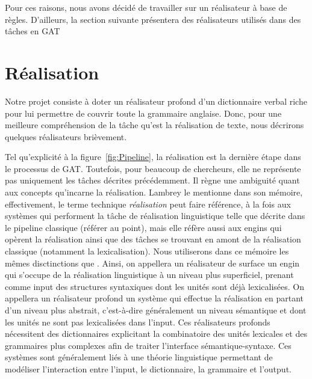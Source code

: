 Pour ces raisons, nous avons décidé de travailler sur un réalisateur à base de règles. D'ailleurs, la section suivante présentera des réalisateurs utilisés dans des tâches en \ac{GAT}




\section{Réalisation}

Notre projet consiste à doter un réalisateur profond d'un dictionnaire verbal riche pour lui permettre de couvrir toute la grammaire anglaise. Donc, pour une meilleure compréhension de la tâche qu'est la réalisation de texte, nous décrirons quelques réalisateurs brièvement.

Tel qu'explicité à la figure~\ref{fig:Pipeline}, la réalisation est la dernière étape dans le processus de \ac{GAT}. Toutefois, pour beaucoup de chercheurs, elle ne représente pas uniquement les tâches décrites précédemment. Il règne une ambiguité quant aux concepts qu'incarne la réalisation. Lambrey le mentionne \citep{LambreyImplementationcollocationspour2017} dans son mémoire, effectivement, le terme technique \emph{réalisation} peut faire référence, à la fois aux systèmes qui performent la tâche de réalisation linguistique telle que décrite dans le pipeline classique (référer au point), mais elle réfère aussi aux engins qui opèrent la réalisation ainsi que des tâches se trouvant en amont de la réalisation classique (notamment la lexicalisation). Nous utiliserons dans ce mémoire les mêmes disctinctions que \citep{LambreyImplementationcollocationspour2017}. Ainsi, on appellera un réalisateur de surface un engin qui s'occupe de la réalisation linguistique à un niveau plus superficiel, prenant comme input des structures syntaxiques dont les unités sont déjà lexicalisées. On appellera un réalisateur profond un système qui effectue la réalisation en partant d'un niveau plus abstrait, c'est-à-dire généralement un niveau sémantique et dont les unités ne sont pas lexicalisées dans l'input. Ces réalisateurs profonds nécessitent des dictionnaires explicitant la combinatoire des unités lexicales et des grammaires plus complexes afin de traiter l'interface sémantique-syntaxe. Ces systèmes sont généralement liés à une théorie linguistique permettant de modéliser l'interaction entre l'input, le dictionnaire, la grammaire et l'output.

